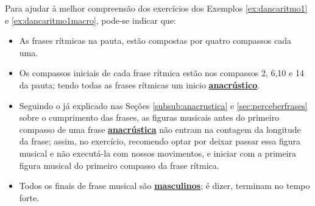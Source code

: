 \begin{tcbattention}
Para ajudar à melhor compreensão dos exercícios dos Exemplos \ref{ex:dancaritmo1} e \ref{ex:dancaritmo1macro}, 
pode-se indicar que: 
\begin{itemize}
\item As frases rítmicas na pauta, 
estão compostas  por quatro compassos cada uma.
\item Os compassos iniciais de cada frase rítmica
estão nos compassos 2, 6,10 e 14 da pauta; tendo todas as frases rítmicas um inicio 
\hyperref[subsub:anacrustica]{\textbf{anacrústico}}.
\item Seguindo o já explicado nas Seções \ref{subsub:anacrustica} e \ref{sec:perceberfrases} 
sobre o cumprimento das frases, 
as figuras musicais antes do primeiro compasso de uma frase 
\hyperref[subsub:anacrustica]{\textbf{anacrústica}} não entram na contagem da longitude da frase;
assim, no exercício, recomendo optar por deixar passar essa figura musical e não executá-la com nossos movimentos,
e iniciar com a primeira figura musical do primeiro compasso da frase rítmica.
\item Todos os finais de frase musical são \hyperref[subsec:finaldefrasemus1]{\textbf{masculinos}};
é dizer, terminam no tempo forte.
\end{itemize}
\end{tcbattention}

